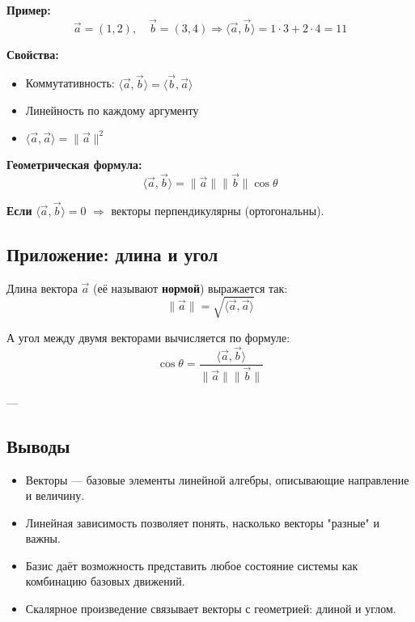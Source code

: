 \textbf{Пример:}
\[
\vec{a} = (1, 2), \quad \vec{b} = (3, 4) \Rightarrow \langle \vec{a}, \vec{b} \rangle = 1\cdot3 + 2\cdot4 = 11
\]

\textbf{Свойства:}
\begin{itemize}
  \item Коммутативность: $\langle \vec{a}, \vec{b} \rangle = \langle \vec{b}, \vec{a} \rangle$
  \item Линейность по каждому аргументу
  \item $\langle \vec{a}, \vec{a} \rangle = \|\vec{a}\|^2$
\end{itemize}

\textbf{Геометрическая формула:}
\[
\langle \vec{a}, \vec{b} \rangle = \|\vec{a}\|\|\vec{b}\|\cos\theta
\]

\textbf{Если } $\langle \vec{a}, \vec{b} \rangle = 0$ $\Rightarrow$ векторы перпендикулярны (ортогональны).

\vspace{1em}
\begin{center}
\end{center}

\subsection*{Приложение: длина и угол}
Длина вектора $\vec{a}$ (её называют \textbf{нормой}) выражается так:
\[
\|\vec{a}\| = \sqrt{\langle \vec{a}, \vec{a} \rangle}
\]

А угол между двумя векторами вычисляется по формуле:
\[
\cos\theta = \frac{\langle \vec{a}, \vec{b} \rangle}{\|\vec{a}\|\|\vec{b}\|}
\]

---

\subsection*{Выводы}
\begin{itemize}
  \item Векторы — базовые элементы линейной алгебры, описывающие направление и величину.
  \item Линейная зависимость позволяет понять, насколько векторы "разные" и важны.
  \item Базис даёт возможность представить любое состояние системы как комбинацию базовых движений.
  \item Скалярное произведение связывает векторы с геометрией: длиной и углом.
\end{itemize}
